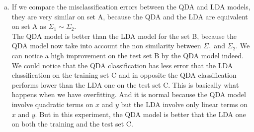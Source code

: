 \documentclass[a4paper,10pt]{article}
\theoremstyle{exostyle}
\begin{document}
\begin{enumerate}[(a)]
\item If we compare the misclassification errors between the QDA and LDA models, they are very similar on set A, because the QDA and the LDA are equivalent on set A as $\Sigma_1 \sim \Sigma_2$.\\
The QDA model is better than the LDA model for the set B, because the QDA model now take into account the non similarity between $\Sigma_1$ and $\Sigma_2$. We can notice a high improvement on the test set B by the QDA model indeed. \\ 
We could notice that the QDA classification has less error that the LDA classification on the training set C and in opposite the QDA classification performs lower than the LDA one on the test set C. This is basically what happens when we have overfitting. And it is normal because the QDA model involve quadratic terms on $x$ and $y$ but the LDA involve only linear terms on $x$ and $y$. But in this experiment, the QDA model is better that the LDA one on both the training and the test set C.  

\end{enumerate}
\end{document}
